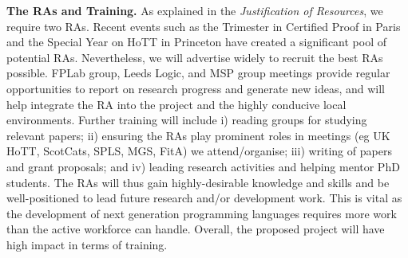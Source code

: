 \documentclass[a4paper,11pt]{article}
\begin{document}

{\bf The RAs and Training.} As explained in the
{\em Justification of Resources}, we require two RAs.
Recent events such as the Trimester in Certified Proof in Paris
and the Special Year on HoTT in Princeton have created a significant pool of
potential RAs. Nevertheless, we will advertise widely to recruit the best RAs
possible.  FPLab group, Leeds Logic, and MSP group meetings provide
regular opportunities to report on research progress and generate new
ideas, and will help integrate the RA into the project and the highly
conducive local environments. Further training will include i) reading
groups for studying relevant papers; ii) ensuring the RAs play
prominent roles in meetings (eg UK HoTT, ScotCats, SPLS, MGS, FitA) we
attend/organise; iii) writing of papers and grant proposals; and
iv) leading research activities and helping mentor PhD students.
The RAs will thus gain highly-desirable
knowledge and skills and be well-positioned to lead future research
and/or development work. This is vital as the development of
next generation programming languages requires more work than the
active workforce can handle. Overall, the proposed project will have
high impact in terms of training.





\begin{footnotesize}
\begin{multicols}{2}

%
%

\end{multicols}
\end{footnotesize}

% 
% 
\end{document}
